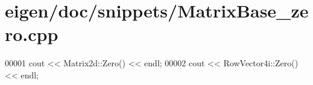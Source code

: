 \hypertarget{eigen_2doc_2snippets_2_matrix_base__zero_8cpp_source}{}\section{eigen/doc/snippets/\+Matrix\+Base\+\_\+zero.cpp}
\label{eigen_2doc_2snippets_2_matrix_base__zero_8cpp_source}

\begin{DoxyCode}
00001 cout << Matrix2d::Zero() << endl;
00002 cout << RowVector4i::Zero() << endl;
\end{DoxyCode}
